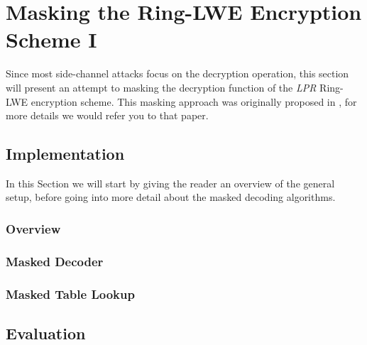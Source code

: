 %
%

\chapter{Masking the Ring-LWE Encryption Scheme I}
Since most side-channel attacks focus on the decryption operation, this section will present an attempt to masking the decryption function of the \textit{LPR} Ring-LWE encryption scheme. This masking approach was originally proposed in \cite{maskedRing}, for more details we would refer you to that paper.

\section{Implementation}
In this Section we will start by giving the reader an overview of the general setup, before going into more detail about the masked decoding algorithms.

\subsection{Overview}

\subsection{Masked Decoder}

\subsection{Masked Table Lookup}

\section{Evaluation}